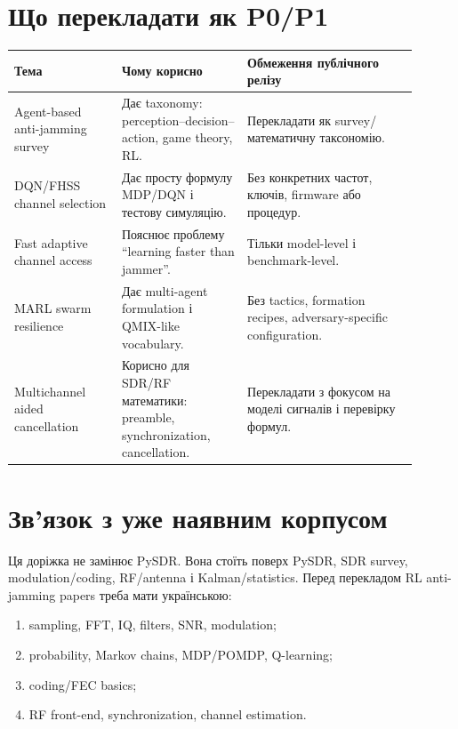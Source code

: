 \section*{Що перекладати як P0/P1}

\begin{longtable}{L{0.24\linewidth}L{0.28\linewidth}L{0.38\linewidth}}
\toprule
Тема & Чому корисно & Обмеження публічного релізу \\
\midrule
Agent-based anti-jamming survey & Дає taxonomy: perception--decision--action, game theory, RL. & Перекладати як survey/математичну таксономію. \\
DQN/FHSS channel selection & Дає просту формулу MDP/DQN і тестову симуляцію. & Без конкретних частот, ключів, firmware або процедур. \\
Fast adaptive channel access & Пояснює проблему ``learning faster than jammer''. & Тільки model-level і benchmark-level. \\
MARL swarm resilience & Дає multi-agent formulation і QMIX-like vocabulary. & Без tactics, formation recipes, adversary-specific configuration. \\
Multichannel aided cancellation & Корисно для SDR/RF математики: preamble, synchronization, cancellation. & Перекладати з фокусом на моделі сигналів і перевірку формул. \\
\bottomrule
\end{longtable}

\section*{Зв'язок з уже наявним корпусом}

Ця доріжка не замінює PySDR. Вона стоїть поверх PySDR, SDR survey, modulation/coding, RF/antenna і Kalman/statistics. Перед перекладом RL anti-jamming papers треба мати українською:
\begin{enumerate}[leftmargin=2em]
\item sampling, FFT, IQ, filters, SNR, modulation;
\item probability, Markov chains, MDP/POMDP, Q-learning;
\item coding/FEC basics;
\item RF front-end, synchronization, channel estimation.
\end{enumerate}
